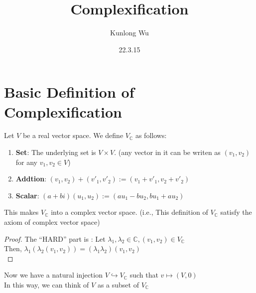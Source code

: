 \documentclass{aq-notes}
\title{Complexification}
\author{Kunlong Wu}
\date{22.3.15}
\begin{document}
\section{Basic Definition of Complexification}
    \begin{definition}
        Let $V$ be a real vector space. We define $V_\mathbb{C}$ as follows:
        \begin{enumerate}
            \item {\bf Set}: The underlying set is $V\times V$. 
            (any vector in it can be writen as $(v_1,v_2)$ for any $v_1,v_2\in V$)
            \item {\bf Addtion}: $(v_1, v_2) + (v'_1, v'_2) := (v_1+v'_1, v_2+v'_2) $
            \item {\bf Scalar}: $(a + bi)(u_1,u_2) := (au_1-bu_2,bu_1+au_2)$
        \end{enumerate}
    \end{definition}
\begin{claim}
            This makes $V_\mathbb{C}$ into a complex vector space. 
            (i.e., This definition of $V_\mathbb{C}$ satisfy the 
            axiom of complex vector space)
\end{claim}
    \begin{proof}
        The ``HARD'' part is : Let $\lambda_1, \lambda_2 \in \mathbb{C}, (v_1,v_2)\in V_\mathbb{C}$\\
        Then, $\lambda_1(\lambda_2(v_1,v_2)) = (\lambda_1\lambda_2)(v_1,v_2)$\\
    \end{proof}
    Now we have a natural injection $V \hookrightarrow V_\mathbb{C}$ such that $v \mapsto (V, 0)$\\
    In this way, we can think of $V$ as a subset of $V_\mathbb{C}$
\end{document}
